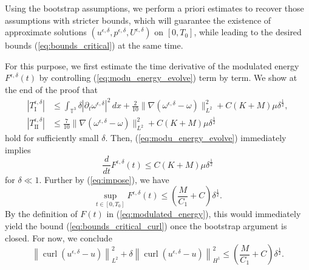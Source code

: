 \documentclass[reqno,10pt]{amsart}
\theoremstyle{definition}
\theoremstyle{remark}
\numberwithin{equation}{section}
\DeclareMathOperator{\curl}{curl}
\begin{document}
Using the bootstrap assumptions, we perform a priori estimates to recover those assumptions with stricter bounds, which will guarantee the existence of approximate solutions $(u^{\epsilon,\delta},p^{\epsilon,\delta},U^{\epsilon,\delta})$ on $[0,T_0]$, while leading to the desired bounds (\ref{eq:bounds_critical}) at the same time.

For this purpose, we first estimate the time derivative of the modulated energy $F^{\epsilon,\delta}(t)$ by controlling (\ref{eq:modu_energy_evolve}) term by term. We show  at the end of the proof that
\begin{align} 
    |T^{\epsilon,\delta}_\text{I}| &\le \int_{\mathbb T^3} \delta \left|\partial_t\omega^{\epsilon,\delta}\right|^2\, dx + \frac{2}{10} \|\nabla (\omega^{\epsilon,\delta}-\omega)\|_{L^2}^2 + C(K+M)\mu\delta^{\frac{1}{2}}, \label{eq:dFdt_I} \\
    |T^{\epsilon,\delta}_\text{II}| &\le \frac{7}{10}\|\nabla(\omega^{\epsilon,\delta}-\omega)\|_{L^2}^2 + C(K+M)\mu\delta^{\frac{1}{2}} \label{eq:dFdt_II}
\end{align}
hold for sufficiently small $\delta$. Then, (\ref{eq:modu_energy_evolve}) immediately implies
\[
    \frac{d}{dt}F^{\epsilon,\delta}(t) \le C(K+M)\mu\delta^{\frac{1}{2}}
\]
for $\delta\ll 1$. Further by (\ref{eq:impose}), we have
\[
    \sup_{t\in[0,T_0]} F^{\epsilon,\delta}(t) \le \left(\frac{M}{C_1}+C\right)\delta^{\frac{1}{2}}.
\]
By the definition of $F(t)$ in (\ref{eq:modulated_energy}), this would immediately yield the bound (\ref{eq:bounds_critical_curl}) once the bootstrap argument is closed. For now, we conclude 
\begin{equation} \label{eq:curlu_est}
    \left\|\curl(u^{\epsilon,\delta} - u)\right\|_{L^2}^2 + \delta\left\|\curl(u^{\epsilon,\delta} - u)\right\|_{H^1}^2 \le \left(\frac{M}{C_1}+C\right)\delta^{\frac{1}{2}}.
\end{equation}
\end{document}
